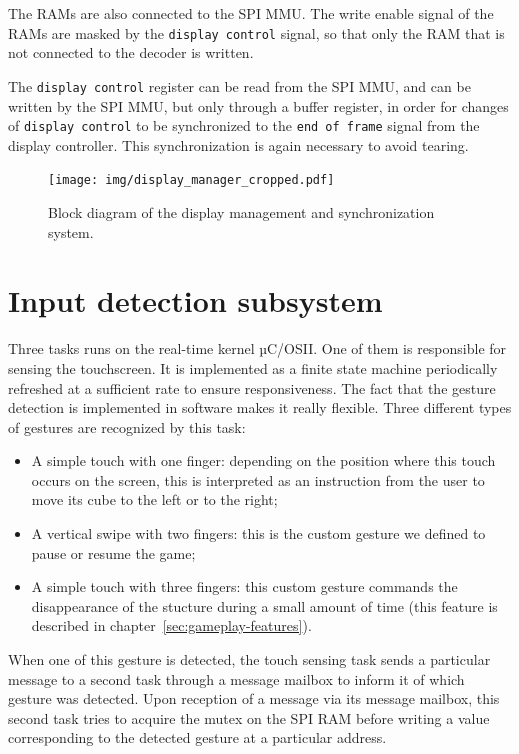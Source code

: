 \documentclass[english, DIV=13]{scrreprt}
\begin{document}
The RAMs are also connected to the SPI MMU. The write enable
signal of the RAMs are masked by the \texttt{display control} signal,
so that only the RAM that is not connected to the decoder is written.

The \texttt{display control} register can be read from the SPI MMU,
and can be written by the SPI MMU, but only through a buffer register,
in order for changes of \texttt{display control} to be synchronized
to the \texttt{end of frame} signal from the display controller.
This synchronization is again necessary to avoid tearing.

\begin{figure}[bth]
    \centering
    \texttt{[image: img/display\_manager\_cropped.pdf]}
    \caption{Block diagram of the display management and synchronization system.}
    \label{fig:display-manager}
\end{figure}

\section{Input detection subsystem}
\label{sec:input-det}

Three tasks runs on the real-time kernel µC/OSII. One of them is responsible
for sensing the touchscreen. It is implemented as a finite state machine periodically
refreshed at a sufficient rate to ensure responsiveness. The fact that the gesture
detection is implemented in software makes it really flexible. Three different types of
gestures are recognized by this task:
\begin{itemize}
    \item A simple touch with one finger: depending on the position where this touch
    occurs on the screen, this is interpreted as an instruction from the user to move
    its cube to the left or to the right;
    \item A vertical swipe with two fingers: this is the custom gesture we defined to
    pause or resume the game;
    \item A simple touch with three fingers: this custom gesture commands the
    disappearance of the stucture during a small amount of time (this feature is
    described in chapter~\ref{sec:gameplay-features}).
\end{itemize}
When one of this gesture is detected, the touch sensing task sends a particular
message to a second task through a message mailbox to inform it of which gesture
was detected. Upon reception of a message via its message mailbox, this second task
tries to acquire the mutex on the SPI RAM before writing a value corresponding
to the detected gesture at a particular address.
\end{document}
